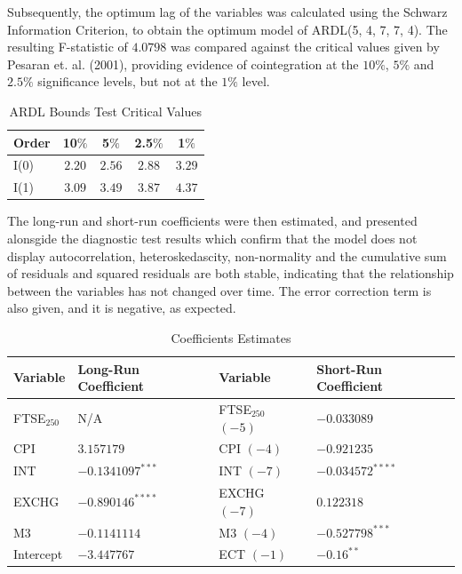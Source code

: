 \documentclass[11pt,a4paper]{article}
\begin{document}
Subsequently, the optimum lag of the variables was calculated using the 
Schwarz Information Criterion, to obtain the optimum model 
of ARDL(5, 4, 7, 7, 4). The resulting F-statistic of $4.0798$ was compared against the critical values
given by Pesaran et. al. (2001), providing evidence of cointegration 
at the $10\%$, $5\%$ and $2.5\%$ significance levels, but not at the $1\%$ 
level.

\begin{table}[h!]
    \centering
    \caption{ARDL Bounds Test Critical Values}
    \begin{tabular}{lcccc}
        \toprule
        \textbf{Order} & \textbf{10$\%$} & \textbf{5$\%$} & \textbf{2.5$\%$} & \textbf{1$\%$} \\
        \midrule
        I(0) & $2.20$ & $2.56$ & $2.88$ & $3.29$ \\
        I(1) & $3.09$ & $3.49$ & $3.87$  & $4.37$ \\
        \bottomrule
    \end{tabular}
\end{table}

The long-run and short-run coefficients were then estimated, and presented 
alonsgide the diagnostic test results which confirm that the model does not
display autocorrelation, heteroskedascity, non-normality and the cumulative 
sum of residuals and squared residuals are both stable, indicating that the 
relationship between the variables has not changed over time. The error
correction term is also given, and it is negative, as expected.

\begin{table}[h!]
    \centering
    \caption{Coefficients Estimates}
    \begin{tabular}{llll}
        \toprule
        \textbf{Variable} & \textbf{Long-Run Coefficient} & \textbf{Variable} & \textbf{Short-Run Coefficient} \\
        \midrule
        FTSE$_{250}$ & N/A & FTSE$_{250}$ $(-5)$  & $-0.033089$ \\
        CPI & $3.157179$ & CPI $(-4)$ & $-0.921235$ \\
        INT & $-0.1341097^{***}$ & INT $(-7)$ & $-0.034572^{****}$\\
        EXCHG &  $-0.890146^{****}$ & EXCHG $(-7)$ & $0.122318$ \\
        M3 & $-0.1141114$ & M3 $(-4)$ & $-0.527798^{***}$ \\
        Intercept & $-3.447767$ & ECT $(-1)$ & $-0.16^{**}$ \\
        \bottomrule
    \end{tabular}
\end{table}
\end{document}
